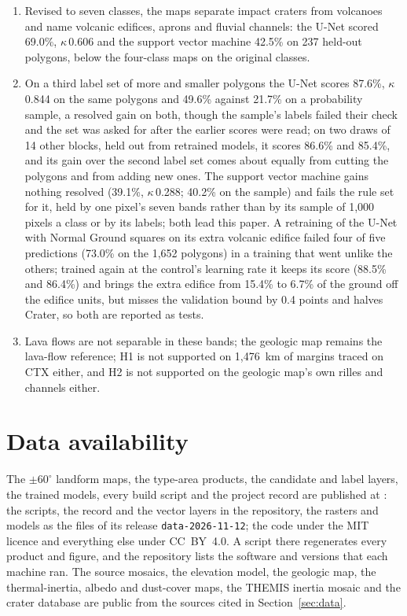 \documentclass[twocolumn]{aastex701}
\newcommand{\kap}{$\kappa$}
\begin{document}
\begin{enumerate}
without them scores 6.4 to 7.6 points lower, a difference not resolved by block but larger than a second
training's under one point; a support vector machine given 51~km
of surroundings loses 8.0 points without them, a resolved difference that the point's map coordinates largely make up. A U-Net reaches 98.9\% as a
terrain-province map.
\item Revised to seven classes, the maps separate impact craters from volcanoes and name volcanic edifices, aprons
and fluvial channels: the U-Net scored 69.0\%, \kap\,0.606 and the support vector machine 42.5\% on 237 held-out
polygons, below the four-class maps on the original classes.
\item On a third label set of more and smaller polygons the U-Net scores 87.6\%, \kap\,0.844 on the same polygons and
49.6\% against 21.7\% on a probability sample, a resolved gain on both, though the sample's labels failed their check and
the set was asked for after the earlier scores were read; on two draws of 14 other blocks, held out from retrained models,
it scores 86.6\% and 85.4\%, and its gain over the second label set comes about equally from cutting the polygons and from adding
new ones. The support vector machine gains nothing resolved (39.1\%,
\kap\,0.288; 40.2\% on the sample) and fails the rule set for it, held by one pixel's seven bands rather than by its
sample of 1,000 pixels a class or by its labels; both lead this paper. A retraining of the U-Net with Normal Ground
squares on its extra volcanic edifice failed four of five predictions (73.0\% on the 1,652 polygons) in a training
that went unlike the others; trained again at the control's learning rate it keeps its score (88.5\% and 86.4\%)
and brings the extra edifice from 15.4\% to 6.7\% of the ground off the edifice units, but misses the validation bound
by 0.4 points and halves Crater, so both are reported as tests.
\item Lava flows are not separable in these bands; the geologic map remains the lava-flow reference; H1 is not supported on 1,476~km of margins traced on CTX either, and H2 is not supported on the geologic map's own rilles and channels either.
\end{enumerate}

\section*{Data availability}

The $\pm60^{\circ}$ landform maps, the type-area products, the candidate and label layers, the trained models, every
build script and the project record are published at \citet{Edwards2026data}: the scripts, the record and the vector
layers in the repository, the rasters and models as the files of its release \texttt{data-2026-11-12}; the code under
the MIT licence and everything else under CC~BY~4.0. A script there regenerates every product and figure, and the
repository lists the software and versions that each machine ran. The source mosaics, the elevation model, the
geologic map, the thermal-inertia, albedo and dust-cover maps, the THEMIS inertia mosaic and the crater database are public from the sources cited in
Section~\ref{sec:data}. %
\end{document}
